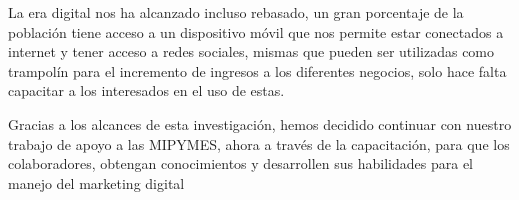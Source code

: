 \documentclass[12pt]{difu100cia} %
\begin{document}
La era digital nos ha alcanzado incluso rebasado, un gran porcentaje de la población tiene acceso a un dispositivo móvil que nos permite estar conectados a internet y tener acceso a redes sociales, mismas que pueden ser utilizadas como trampolín para el incremento de ingresos a los diferentes negocios, solo hace falta capacitar a los interesados en el uso de estas.

Gracias a los alcances de esta investigación, hemos decidido continuar con nuestro trabajo de apoyo a las MIPYMES, ahora a través de la capacitación, para que los colaboradores, obtengan conocimientos y desarrollen sus habilidades para el manejo del marketing digital




\printbibliography

\end{document}
